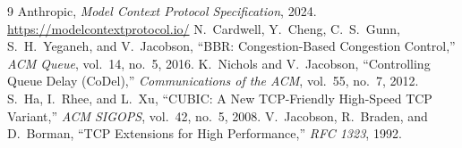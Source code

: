 \documentclass[11pt,a4paper]{article}
\begin{document}
\begin{thebibliography}{9}
 Anthropic, \textit{Model Context Protocol Specification}, 2024. \url{https://modelcontextprotocol.io/}
 N.~Cardwell, Y.~Cheng, C.~S.~Gunn, S.~H.~Yeganeh, and V.~Jacobson, ``BBR: Congestion-Based Congestion Control,'' \textit{ACM Queue}, vol.~14, no.~5, 2016.
 K.~Nichols and V.~Jacobson, ``Controlling Queue Delay (CoDel),'' \textit{Communications of the ACM}, vol.~55, no.~7, 2012.
 S.~Ha, I.~Rhee, and L.~Xu, ``CUBIC: A New TCP-Friendly High-Speed TCP Variant,'' \textit{ACM SIGOPS}, vol.~42, no.~5, 2008.
 V.~Jacobson, R.~Braden, and D.~Borman, ``TCP Extensions for High Performance,'' \textit{RFC 1323}, 1992.
\end{thebibliography}
\end{document}
